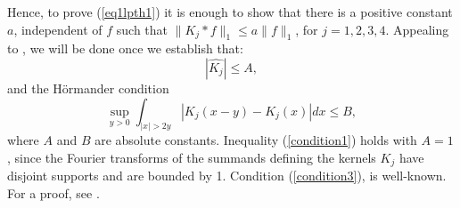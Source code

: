 \documentclass[12pt]{article}
\begin{document}
Hence, to prove (\ref{eq1lpth1}) 
it is enough to show that there is a positive constant
$a$, independent of $f$ such that
$\|K_j*f\|_1\leq a \|f\|_1$, for $j=1,2,3,4$.
Appealing to \cite[Theorem 3, p.\ 114]{stein}, we will be done once we
establish that:
 \begin{equation}
 \left|\widehat{K_j}\right|\leq A,
 \label{condition1}
 \end{equation}
and the H\"{o}rmander condition
\begin{equation}
\sup_{y>0} \int_{|x|>2y} |K_j(x-y)-K_j(x)|dx\leq B,
\label{condition3}
\end{equation}
where $A$ and $B$ are absolute constants.
Inequality (\ref{condition1}) 
holds with $A=1$, since the 
Fourier transforms of the summands defining the 
kernels $K_j$ have disjoint supports and are 
bounded by 1.  Condition (\ref{condition3}), is well-known. 
For a proof, see \cite[pp.\ 138-140, and 7.2.2, p. 142]{eg}.\\
  
\end{document}
